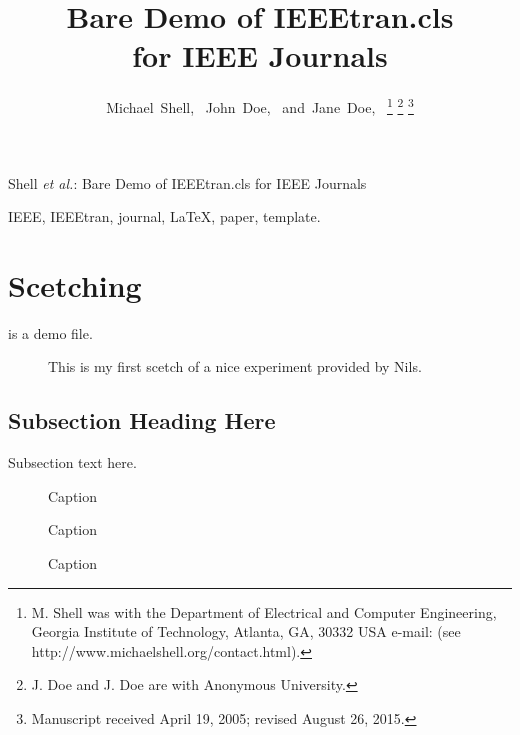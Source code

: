 \documentclass[journal]{IEEEtran}
\begin{document}
\title{Bare Demo of IEEEtran.cls\\ for IEEE Journals}

\author{Michael~Shell,~
        John~Doe,~
        and~Jane~Doe,~%
\thanks{M. Shell was with the Department
of Electrical and Computer Engineering, Georgia Institute of Technology, Atlanta,
GA, 30332 USA e-mail: (see http://www.michaelshell.org/contact.html).}%
\thanks{J. Doe and J. Doe are with Anonymous University.}%
\thanks{Manuscript received April 19, 2005; revised August 26, 2015.}}

%
{Shell \MakeLowercase{\textit{et al.}}: Bare Demo of IEEEtran.cls for IEEE Journals}

\maketitle


\begin{abstract}
\lipsum[1-1]
\end{abstract}

\begin{IEEEkeywords}
IEEE, IEEEtran, journal, \LaTeX, paper, template.
\end{IEEEkeywords}




\IEEEpeerreviewmaketitle



\section{Scetching}
 is a  demo file.
\lipsum[1-2]


\begin{figure}[t]
    \centering
    \caption{This is my first scetch of a nice experiment provided by Nils.}
    \label{fig:labelA}
\end{figure}



\lipsum[1-2]
\subsection{Subsection Heading Here}
Subsection text here.
\begin{figure}[t]
    \centering
    \caption{Caption}
    \label{fig:labelB}
\end{figure}
\lipsum[1-2]
\begin{figure}[t]
    \centering
    \caption{Caption}
    \label{fig:labelC}
\end{figure}
\lipsum[1-2]
\begin{figure}[t]
    \centering
    \caption{Caption}
    \label{fig:labelD}
\end{figure}
\end{document}
